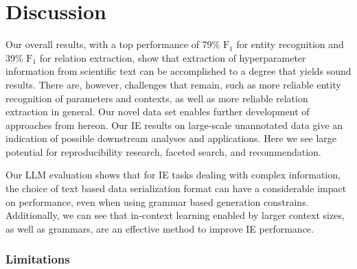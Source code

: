 





\section{Discussion}\label{sec:discussion}

Our overall results, with a top performance of 79\% $\text{F}_1$ for entity recognition and 39\% $\text{F}_1$ for relation extraction, show that extraction of hyperparameter information from scientific text can be accomplished to a degree that yields sound results. There are, however, challenges that remain, such as more reliable entity recognition of parameters and contexts, as well as more reliable relation extraction in general. Our novel data set enables further development of approaches from hereon. Our IE results on large-scale unannotated data give an indication of possible downstream analyses and applications. Here we see large potential for reproducibility research, faceted search, and recommendation.

Our LLM evaluation shows that for IE tasks dealing with complex information, the choice of text based data serialization format can have a considerable impact on performance, even when using grammar based generation constrains. Additionally, we can see that in-context learning enabled by larger context sizes, as well as grammars, are an effective method to improve IE performance.

\subsubsection{Limitations}

